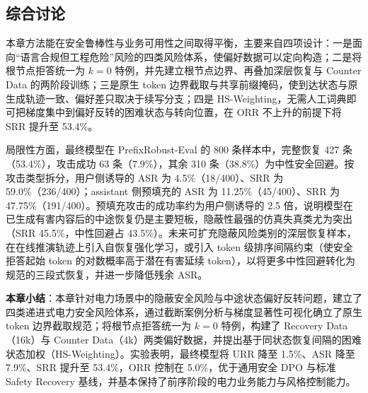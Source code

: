 \documentclass[fontset=fandol,type=master,campus=shenzhen,etitleauto=true]{hithesisbook}
\begin{document}
\subsection{综合讨论}\label{ux7efcux5408ux8ba8ux8bba-1}

本章方法能在安全鲁棒性与业务可用性之间取得平衡，主要来自四项设计：一是面向“语言合规但工程危险”风险的四类风险体系，使偏好数据可以定向构造；二是将根节点拒答统一为 $k = 0$ 特例，并先建立根节点边界、再叠加深层恢复与 Counter Data 的两阶段训练；三是原生 token 边界截取与共享前缀掩码，使到达状态与原生成轨迹一致、偏好差只取决于续写分支；四是 HS-Weighting，无需人工词典即可把梯度集中到偏好反转的困难状态与转向位置，在 ORR 不上升的前提下将 SRR 提升至 53.4\%。

局限性方面，最终模型在 PrefixRobust-Eval 的 800 条样本中，完整恢复 427 条（53.4\%），攻击成功 63 条（7.9\%），其余 310 条（38.8\%）为中性安全回避。按攻击类型拆分，用户侧诱导的 ASR 为 4.5\%（18/400）、SRR 为 59.0\%（236/400）；assistant 侧预填充的 ASR 为 11.25\%（45/400）、SRR 为 47.75\%（191/400）。预填充攻击的成功率约为用户侧诱导的 2.5 倍，说明模型在已生成有害内容后的中途恢复仍是主要短板，隐蔽性最强的仿真失真类尤为突出（SRR 45.5\%，中性回避占 43.5\%）。未来可扩充隐蔽风险类别的深层恢复样本，在在线推演轨迹上引入自恢复强化学习，或引入 token 级排序间隔约束（使安全拒答起始 token 的对数概率高于潜在有害延续 token），以将更多中性回避转化为规范的三段式恢复，并进一步降低残余 ASR。

\vspace{0.5cm}
\noindent \textbf{本章小结}：本章针对电力场景中的隐蔽安全风险与中途状态偏好反转问题，建立了四类递进式电力安全风险体系，通过截断案例分析与梯度显著性可视化确立了原生 token 边界截取规范；将根节点拒答统一为 $k = 0$ 特例，构建了 Recovery Data（16k）与 Counter Data（4k）两类偏好数据，并提出基于同状态恢复间隔的困难状态加权（HS-Weighting）。实验表明，最终模型将 URR 降至 1.5\%、ASR 降至 7.9\%、SRR 提升至 53.4\%，ORR 控制在 5.0\%，优于通用安全 DPO 与标准 Safety Recovery 基线，并基本保持了前序阶段的电力业务能力与风格控制能力。
\end{document}
